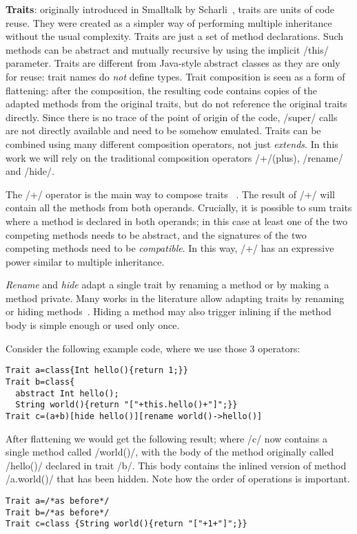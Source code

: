 \textbf{Traits}: originally introduced in Smalltalk by Scharli~\cite{scharli2003traits}, traits are 
units of code reuse. They were created as a simpler way of performing multiple inheritance without the usual complexity.
Traits are just a set of method declarations.
Such methods can be abstract and
mutually recursive by using the implicit /this/ parameter.
Traits are different from Java-style abstract classes as
they are only for reuse: trait names do \emph{not} define types.
Trait composition is seen as a form of flattening: after the composition, the resulting code contains copies of the adapted methods from the original traits, but do not reference the original traits directly. Since there is no trace of
the point of origin of the code, /super/ calls are not 
directly available and need to be somehow emulated.
Traits can be combined using many different composition operators, not just \emph{extends}.
In this work we will rely on the traditional composition operators /+/(plus), /rename/ and /hide/.

The /+/ operator is the main way to compose traits
~\cite{scharli2003traits,LagorioSZ09}.
The result of /+/ will contain all the methods from both operands. 
Crucially, it is possible to sum traits where a method is declared in both operands; in this case at least one of the two competing methods needs to be abstract, and the signatures of the two competing methods need to be \emph{compatible}.
In this way, /+/ has an expressive power similar to multiple inheritance.

\emph{Rename} and \emph{hide} adapt a single trait by renaming a method or by making a method private.
Many works in the literature allow adapting traits by renaming or hiding methods~\cite{servetto2014meta,reppy2007metaprogramming,liquori2008feathertrait}. Hiding a method may also trigger inlining if the method body is simple enough or used only once.


Consider the following example code, where we use those 3 operators:
\begin{lstlisting}
Trait a=class{Int hello(){return 1;}}
Trait b=class{
  abstract Int hello();
  String world(){return "["+this.hello()+"]";}}
Trait c=(a+b)[hide hello()][rename world()->hello()]
\end{lstlisting}
After flattening we would get the following result; where /c/ now contains a single method called
/world()/, with the body of the method originally called /hello()/ declared in trait /b/. This body contains the
inlined version of method /a.world()/ that has been hidden.
Note how the order of operations is important.
\begin{lstlisting}
Trait a=/*as before*/
Trait b=/*as before*/
Trait c=class {String world(){return "["+1+"]";}}
\end{lstlisting}

